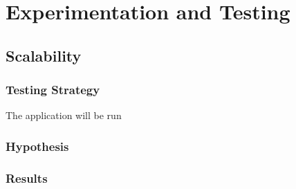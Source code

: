 \documentclass{pdfmx4020}
\begin{document}

  

  

  


\chapter{Experimentation and Testing}

  \section{Scalability} %
  \label{sec:scalability}

    \subsection{Testing Strategy} %
    \label{sub:testing_strategy}
      The application will be run


    \subsection{Hypothesis} %
    \label{sub:hypothesis}
      

    \subsection{Results} %
    \label{sub:results}
      
\end{document}
